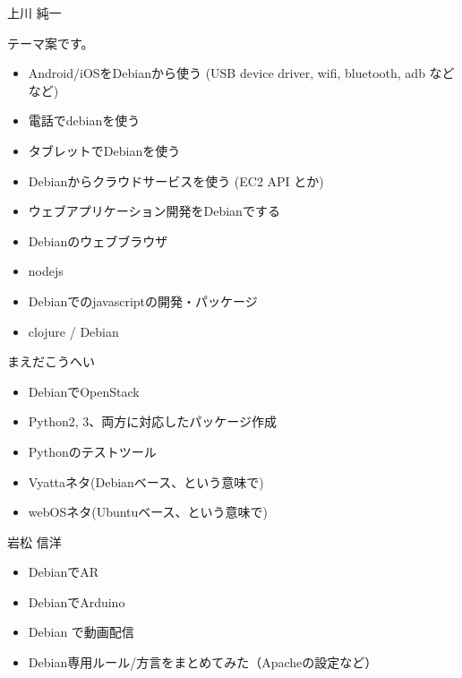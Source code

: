 
\begin{prework}{上川 純一}

テーマ案です。

\begin{itemize}
 \item Android/iOSをDebianから使う (USB device driver, wifi, bluetooth,
       adb などなど)
 \item 電話でdebianを使う
 \item タブレットでDebianを使う
 \item Debianからクラウドサービスを使う (EC2 API とか)
 \item ウェブアプリケーション開発をDebianでする
 \item Debianのウェブブラウザ
 \item nodejs
 \item Debianでのjavascriptの開発・パッケージ
 \item clojure / Debian
\end{itemize}
\end{prework}

\begin{prework}{まえだこうへい}

\begin{itemize}
  \item DebianでOpenStack
  \item Python2, 3、両方に対応したパッケージ作成
  \item Pythonのテストツール
  \item Vyattaネタ(Debianベース、という意味で)
  \item webOSネタ(Ubuntuベース、という意味で)
\end{itemize}
\end{prework}

\begin{prework}{岩松 信洋}

\begin{itemize}
  \item DebianでAR
  \item DebianでArduino
  \item Debian で動画配信
  \item Debian専用ルール/方言をまとめてみた（Apacheの設定など）
\end{itemize}
\end{prework}

